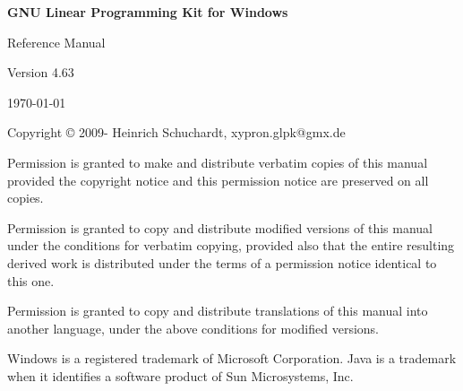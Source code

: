 \documentclass[a4paper,11pt]{report}
\newcommand{\glpkVersion}{4.63}
\begin{document}
\thispagestyle{empty}

\begin{center}

\vspace*{1in}

\begin{huge}
\sf\bfseries GNU Linear Programming Kit\linebreak
for Windows
\end{huge}

\vspace{0.5in}

\begin{LARGE}
\sf Reference Manual
\end{LARGE}

\vspace{0.5in}

\begin{LARGE}
\sf Version \glpkVersion
\end{LARGE}

\vspace{0.5in}
\begin{Large}
\sf \today
\end{Large}
\end{center}

\newpage

\vspace*{1in}

\vfill

\medskip \noindent
Copyright \copyright{} 2009-{\the\year} Heinrich Schuchardt, xypron.glpk@gmx.de

\medskip \noindent
Permission is granted to make and distribute verbatim copies of this
manual provided the copyright notice and this permission notice are
preserved on all copies.

\medskip \noindent
Permission is granted to copy and distribute modified versions of this
manual under the conditions for verbatim copying, provided also that the
entire resulting derived work is distributed under the terms of
a permission notice identical to this one.

\medskip \noindent
Permission is granted to copy and distribute translations of this manual
into another language, under the above conditions for modified versions.

\medskip \noindent
Windows is a registered trademark of Microsoft Corporation. Java is a 
trademark when it identifies a software product of Sun Microsystems, Inc.

\tableofcontents
\end{document}
